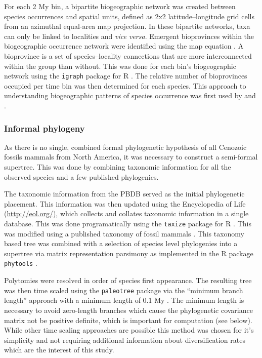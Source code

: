 \documentclass[12pt,letterpaper]{article}
\begin{document}
For each 2 My bin, a bipartite biogeographic network was created between species occurrences and spatial units, defined as 2x2 latitude--longitude grid cells from an azimuthal equal-area map projection. In these bipartite networks, taxa can only be linked to localities and \textit{vice versa}. Emergent bioprovinces within the biogeographic occurrence network were identified using the map equation \citep{Rosvall2008,Rosvall2009a}. A bioprovince is a set of species--locality connections that are more interconnected within the group than without. This was done for each bin's biogeographic network using the \texttt{igraph} package for R \citep{csardi2006igraph,2014language}. The relative number of bioprovinces occupied per time bin was then determined for each species. This approach to understanding biogeographic patterns of species occurrence was first used by \citet{Sidor2013} and \citet{Vilhena2013}. 


\subsubsection{Informal phylogeny}

As there is no single, combined formal phylogenetic hypothesis of all Cenozoic fossils mammals from North America, it was necessary to construct a semi-formal supertree. This was done by combining taxonomic information for all the observed species and a few published phylogenies.

The taxonomic information from the PBDB served as the initial phylogenetic placement. This information was then updated using the Encyclopedia of Life (\url{http://eol.org/}), which collects and collates taxonomic information in a single database. This was done programatically using the \texttt{taxize} package for R \citep{2013taxize}. This was modified using a published taxonomy of fossil mammals \citep{Janis1998,Janis2008}. This taxonomy based tree was combined with a selection of species level phylogenies \cite{Raia2012f,Bininda-Emonds2007} into a supertree via matrix representation parsimony as implemented in the R package \texttt{phytools} \citep{revell2012phytools}.

  Polytomies were resolved in order of species first appearance. The resulting tree was then time scaled using the \texttt{paleotree} package via the ``minimum branch length'' approach with a minimum length of 0.1 My \citep{Bapst2012a}. The minimum length is necessary to avoid zero-length branches which cause the phylogenetic covariance matrix not be positive definite, which is important for computation (see below). While other time scaling approaches are possible \citep{Bapst2013a,Hedman2010} this method was chosen for it's simplicity and not requiring additional information about diversification rates which are the interest of this study. 
\end{document}
